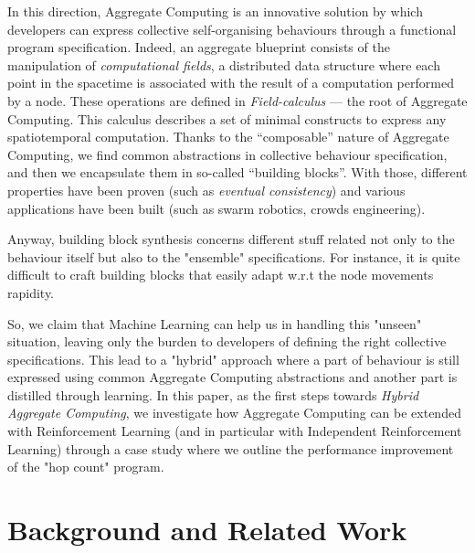 \documentclass[
  twocolumn,
]{ceurart}
\begin{document}
In this direction, Aggregate Computing is an innovative solution by which 
 developers can express collective self-organising behaviours through a functional program specification.
%
Indeed, an aggregate blueprint consists of the manipulation of \textit{computational fields}, a distributed
 data structure where each point in the spacetime is associated with the result of a computation
 performed by a node.
%
These operations are defined in \textit{Field-calculus} --- the root of Aggregate Computing. 
 This calculus describes a set of minimal constructs to express any spatiotemporal computation.
%
Thanks to the ``composable'' nature of Aggregate Computing, we find common abstractions 
 in collective behaviour specification, and then we encapsulate them in so-called ``building blocks''.
%
With those, different properties have been proven (such as \textit{eventual consistency}) and various
 applications have been built (such as swarm robotics, crowds engineering).

Anyway, building block synthesis concerns different stuff related not only to the behaviour itself
 but also to the "ensemble" specifications. 
 For instance, it is quite difficult to craft building blocks
 that easily adapt w.r.t the node movements rapidity.

So, we claim that Machine Learning can help us in handling this "unseen" situation, leaving only the burden
 to developers of defining the right collective specifications.
%
This lead to a "hybrid" approach where a part of behaviour is still expressed using common 
 Aggregate Computing abstractions and another part is distilled through learning.
%
In this paper, as the first steps towards \textit{Hybrid Aggregate Computing}, we investigate how Aggregate Computing can be
 extended with Reinforcement Learning (and in particular with Independent Reinforcement Learning) through a case
 study where we outline the performance improvement of the "hop count" program.

\section{Background and Related Work}
\end{document}
